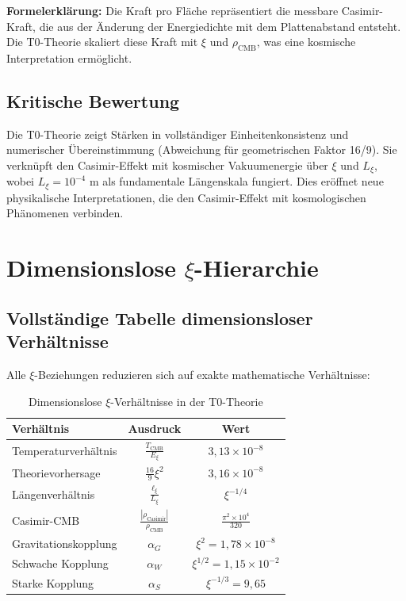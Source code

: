 \documentclass[12pt,a4paper]{article}
\begin{document}
	\textbf{Formelerklärung:} Die Kraft pro Fläche repräsentiert die messbare Casimir-Kraft, die aus der Änderung der Energiedichte mit dem Plattenabstand entsteht. Die T0-Theorie skaliert diese Kraft mit $\xi$ und $\rho_{\text{CMB}}$, was eine kosmische Interpretation ermöglicht.
	
	\subsection{Kritische Bewertung}
	Die T0-Theorie zeigt Stärken in vollständiger Einheitenkonsistenz und numerischer Übereinstimmung (Abweichung für geometrischen Faktor 16/9). Sie verknüpft den Casimir-Effekt mit kosmischer Vakuumenergie über $\xi$ und $L_\xi$, wobei $L_\xi = 10^{-4}$ m als fundamentale Längenskala fungiert. Dies eröffnet neue physikalische Interpretationen, die den Casimir-Effekt mit kosmologischen Phänomenen verbinden.
	
	\section{Dimensionslose $\xi$-Hierarchie}
	
	\subsection{Vollständige Tabelle dimensionsloser Verhältnisse}
	
	Alle $\xi$-Beziehungen reduzieren sich auf exakte mathematische Verhältnisse:
	
	\begin{table}[htbp]
		\centering
		\caption{Dimensionslose $\xi$-Verhältnisse in der T0-Theorie}
		\begin{tabular}{lcc}
			\toprule
			\textbf{Verhältnis} & \textbf{Ausdruck} & \textbf{Wert} \\
			\midrule
			Temperaturverhältnis & $\frac{T_{\text{CMB}}}{E_\xi}$ & $3,13 \times 10^{-8}$ \\
			Theorievorhersage & $\frac{16}{9}\xi^2$ & $3,16 \times 10^{-8}$ \\
			Längenverhältnis & $\frac{\ell_{\xi}}{L_\xi}$ & $\xi^{-1/4}$ \\
			Casimir-CMB & $\frac{|\rho_{\text{Casimir}}|}{\rho_{\text{CMB}}}$ & $\frac{\pi^2 \times 10^4}{320}$ \\
			Gravitationskopplung & $\alpha_G$ & $\xi^2 = 1,78 \times 10^{-8}$ \\
			Schwache Kopplung & $\alpha_W$ & $\xi^{1/2} = 1,15 \times 10^{-2}$ \\
			Starke Kopplung & $\alpha_S$ & $\xi^{-1/3} = 9,65$ \\
			\bottomrule
		\end{tabular}
	\end{table}
	
\end{document}
